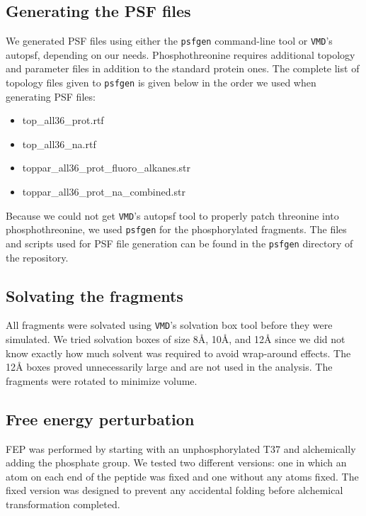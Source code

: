 
\subsection{Generating the PSF files}
We generated PSF files using either the \texttt{psfgen} command-line tool or \texttt{VMD}'s autopsf, depending on our needs.
Phosphothreonine requires additional topology and parameter files in addition to the standard protein ones.
The complete list of topology files given to \texttt{psfgen} is given below in the order we used when generating PSF files:
\begin{itemize} \itemsep 1pt
  \item top\_all36\_prot.rtf
  \item top\_all36\_na.rtf
  \item toppar\_all36\_prot\_fluoro\_alkanes.str
  \item toppar\_all36\_prot\_na\_combined.str
\end{itemize}
Because we could not get \texttt{VMD}'s autopsf tool to properly patch threonine into phosphothreonine, we used \texttt{psfgen} for the phosphorylated fragments.
The files and scripts used for PSF file generation can be found in the \texttt{psfgen} directory of the repository.

\subsection{Solvating the fragments}
All fragments were solvated using \texttt{VMD}'s solvation box tool before they were simulated.
We tried solvation boxes of size 8\AA, 10\AA, and 12{\AA} since we did not know exactly how much solvent was required to avoid wrap-around effects.
The 12{\AA} boxes proved unnecessarily large and are not used in the analysis.
The fragments were rotated to minimize volume.

\subsection{Free energy perturbation}
FEP was performed by starting with an unphosphorylated T37 and alchemically adding the phosphate group.
We tested two different versions: one in which an atom on each end of the peptide was fixed and one without any atoms fixed.
The fixed version was designed to prevent any accidental folding before alchemical transformation completed.

